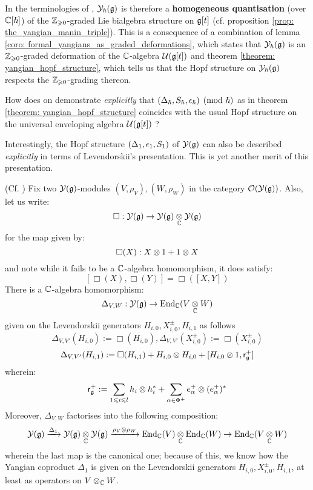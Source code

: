         \begin{remark}
            In the terminologies of \cite{wendlandt_restricted_quantum_doubles_of_yangians}, $\mathcal{Y}_{\hbar}(\mathfrak{g})$ is therefore a \textbf{homogeneous quantisation} (over $\mathbb{C}[\hbar]$) of the $\mathbb{Z}_{\geqslant 0}$-graded Lie bialgebra structure on $\mathfrak{g}[t]$ (cf. proposition \ref{prop: the_yangian_manin_triple}). This is a consequence of a combination of lemma \ref{coro: formal_yangians_as_graded_deformations}, which states that $\mathcal{Y}_{\hbar}(\mathfrak{g})$ is an $\mathbb{Z}_{\geqslant 0}$-graded deformation of the $\mathbb{C}$-algebra $\mathcal{U}(\mathfrak{g}[t])$ and theorem \ref{theorem: yangian_hopf_structure}, which tells us that the Hopf structure on $\mathcal{Y}_{\hbar}(\mathfrak{g})$ respects the $\mathbb{Z}_{\geqslant 0}$-grading thereon. 
        \end{remark}
        \begin{question}
            How does on demonstrate \textit{explicitly} that $(\Delta_{\hbar}, S_{\hbar}, \epsilon_{\hbar}) \pmod{\hbar}$ as in theorem \ref{theorem: yangian_hopf_structure} coincides with the usual Hopf structure on the universal enveloping algebra $\mathcal{U}(\mathfrak{g}[t])$ ?
        \end{question}
        Interestingly, the Hopf structure $(\Delta_1, \epsilon_1, S_1)$ of $\mathcal{Y}(\mathfrak{g})$ can also be described \textit{explicitly} in terms of Levendorskii's presentation. This is yet another merit of this presentation. 
        \begin{proposition} \label{prop: yangian_hopf_structure_via_levendorskii_presentation}
            (Cf. \cite[Definition 4.6, Theorem 4.9, and Proposition 5.18]{guay_nakajima_wendlandt_affine_yangian_coproduct}) Fix two $\mathcal{Y}(\mathfrak{g})$-modules $(V, \rho_V), (W, \rho_W)$ in the category $\mathcal{O}(\mathcal{Y}(\mathfrak{g}))$. Also, let us write:
                $$\Box: \calY(\g) \to \calY(\g) \tensor_{\bbC} \calY(\g)$$
            for the map given by:
                $$\Box(X): X \tensor 1 + 1 \tensor X$$
            and note while it fails to be a $\mathbb{C}$-algebra homomorphism, it does satisfy:
                $$[ \Box(X), \Box(Y) ] = \Box( [X, Y] )$$
            There is a $\mathbb{C}$-algebra homomorphism:
                $$\Delta_{V, W}: \calY(\g) \to \End_{\bbC}(V \tensor_{\bbC} W)$$
            given on the Levendorskii generators $H_{i, 0}, X_{i, 0}^{\pm}, H_{i, 1}$ as follows
                $$\Delta_{V, V'}(H_{i, 0}) := \Box(H_{i, 0}), \Delta_{V, V'}(X_{i, 0}^{\pm}) := \Box(X_{i, 0}^{\pm})$$
                $$\Delta_{V, V'}(H_{i, 1}) := \Box(H_{i, 1}) + H_{i, 0} \tensor H_{i, 0} + [H_{i, 0} \tensor 1, \sfr_{\g}^+]$$
            wherein:
                $$\sfr_{\g}^+ := \sum_{1 \leq i \leq l} h_i \tensor h_i^* + \sum_{\alpha \in \Phi^+} e_{\alpha}^+ \tensor ( e_{\alpha}^+ )^*$$
            Moreover, $\Delta_{V, W}$ factorises into the following composition:
                $$\calY(\g) \xrightarrow[]{\Delta_1} \calY(\g) \tensor_{\bbC} \calY(\g) \xrightarrow[]{\rho_V \tensor \rho_W} \End_{\bbC}(V) \tensor_{\bbC} \End_{\bbC}(W) \to \End_{\bbC}(V \tensor_{\bbC} W)$$
            wherein the last map is the canonical one; because of this, we know how the Yangian coproduct $\Delta_1$ is given on the Levendorskii generators $H_{i, 0}, X_{i, 0}^{\pm}, H_{i, 1}$, at least as operators on $V \tensor_{\bbC} W$. 
        \end{proposition}
